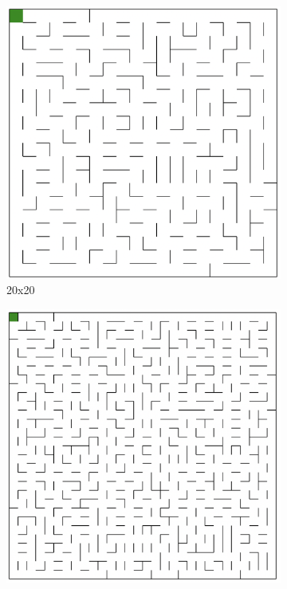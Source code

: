 \documentclass{article}
\begin{document}
\begin{figure}[h]
\begin{subfigure}[b]{0.3\textwidth}
        \includegraphics[width=\textwidth]{imgs/20x20.eps}
        \caption{20x20}
    \end{subfigure}
    \begin{subfigure}[b]{0.3\textwidth}
        \centering
        \includegraphics[width=\textwidth]{imgs/30x30.eps}

\end{subfigure}
\end{figure}
\end{document}
